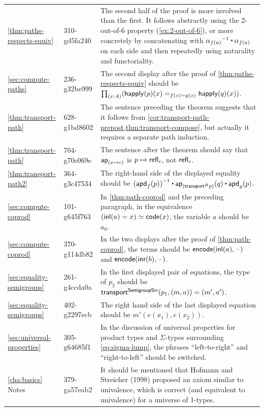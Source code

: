 \documentclass[
%
%
11pt %
]{article}
\begin{document}
\begin{longtable}{llp{10.5cm}}
  \cref{thm:paths-respects-equiv}
  & 310-gd5fa240
  & The second half of the proof is more involved than the first.
  It follows abstractly using the 2-out-of-6 property (\cref{ex:2-out-of-6}), or more concretely by concatenating with $\opp{\alpha_{f(a)}} \ct {\alpha_{f(a)}}$ on each side and then repeatedly using naturality and functoriality.\\
  \cref{sec:compute-paths}
  & 236-g32be999
  & The second display after the proof of \cref{thm:paths-respects-equiv} should be $\prd{x:A} (\id[f(x)=g(x)] {\happly(p)(x)}{\happly(q)(x)})$.\\
  \cref{thm:transport-path}
  & 628-g1bd8602
  & The sentence preceding the theorem suggests that it follows from \cref{cor:transport-path-prepost,thm:transport-compose}, but actually it requires a separate path induction.\\
  \cref{thm:transport-path}
  & 704-g70c069e
  & The sentence after the theorem should say that $\mathsf{ap}_{(x \mapsto c)}$ is $p \mapsto\mathsf{refl}_{c}$, not $\mathsf{refl}_{c}$.\\
  \cref{thm:transport-path2}
  & 364-g3c47534
  & The right-hand side of the displayed equality should be $\opp{(\apdfunc{f}(p))} \ct \apfunc{(\transfibf{B}{p})}(q) \ct \apdfunc{g}(p)$.\\
  \cref{sec:compute-coprod}
  & 101-g645f763
  & In \cref{thm:path-coprod} and the preceding paragraph, in the equivalence $({\mathsf{inl}}(a)=x) \simeq \mathsf{code}(x)$, the variable $a$ should be $a_0$. \\
  \cref{sec:compute-coprod}
  & 370-g114db82
  & In the two displays after the proof of \cref{thm:path-coprod}, the terms should be $\mathsf{encode}({\mathsf{inl}}(a), {\mathord{\hspace{1pt}\text{--}\hspace{1pt}}})$ and $\mathsf{encode}({\mathsf{inr}}(b), {\mathord{\hspace{1pt}\text{--}\hspace{1pt}}})$.\\
  \cref{sec:equality-semigroups}
  & 261-g4ccda0a
  & In the first displayed pair of equations, the type of $p_2$ should be $\mathsf{transport}^{\mathsf{SemigroupStr}}(p_1,(m,a)) = {(m',a')}$.\\
  \cref{sec:equality-semigroups}
  & 402-g2297ecb
  & The right hand side of the last displayed equation should be $m'(e(x_1),e(x_2))$.\\
  \cref{sec:universal-properties}
  & 305-g64685f1
  & In the discussion of universal properties for product types and $\Sigma$-types surrounding \cref{eq:sigma-lump}, the phrases ``left-to-right'' and ``right-to-left'' should be switched.\\
  \cref{cha:basics} Notes
  & 379-ga57eab2
  & It should be mentioned that Hofmann and Streicher (1998) proposed an axiom similar to univalence, which is correct (and equivalent to univalence) for a universe of 1-types.\\

\end{longtable}
\end{document}
